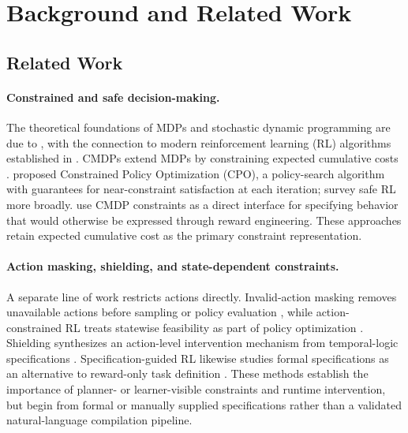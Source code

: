 \documentclass[journal]{IEEEtran}
\theoremstyle{definition}
\begin{document}
\section{Background and Related Work}
\label{sec:background}

\subsection{Related Work}
\label{subsec:related}

\paragraph{Constrained and safe decision-making.}
The theoretical foundations of MDPs and stochastic dynamic programming are
due to \cite{puterman1994}, with the connection to modern reinforcement
learning (RL) algorithms established in \cite{sutton2018}. CMDPs extend MDPs
by constraining expected cumulative costs \cite{altman1999}.
\cite{achiam2017cpo} proposed Constrained Policy Optimization (CPO), a
policy-search algorithm with guarantees for near-constraint satisfaction at
each iteration; \cite{garcia2015} survey safe RL more broadly.
\cite{roy2022behavior} use CMDP constraints as a direct interface for
specifying behavior that would otherwise be expressed through reward
engineering. These approaches retain expected cumulative cost as the primary
constraint representation.

\paragraph{Action masking, shielding, and state-dependent constraints.}
A separate line of work restricts actions directly. Invalid-action masking
removes unavailable actions before sampling or policy evaluation
\cite{huang2022}, while action-constrained RL treats statewise feasibility as
part of policy optimization \cite{lin2021actionconstrained}. Shielding
synthesizes an action-level intervention mechanism from temporal-logic
specifications \cite{alshiekh2018shielding}. Specification-guided RL likewise
studies formal specifications as an alternative to reward-only task definition
\citep{jothimurugan2025specification}. These methods establish the importance
of planner- or learner-visible constraints and runtime intervention, but begin
from formal or manually supplied specifications rather than a validated
natural-language compilation pipeline.
\end{document}
